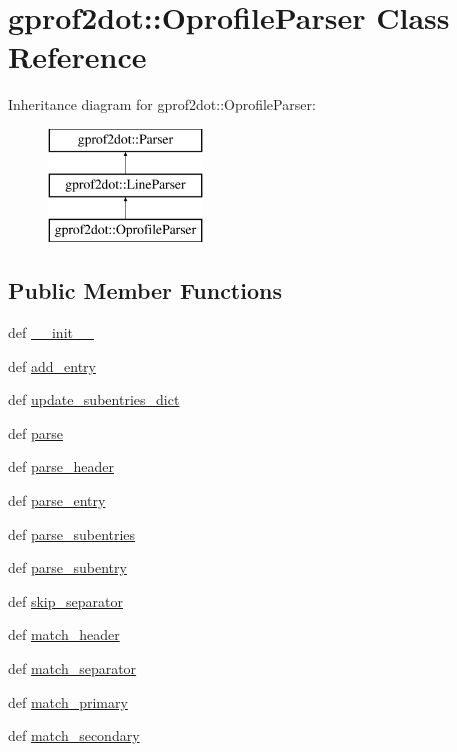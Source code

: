 \hypertarget{classgprof2dot_1_1OprofileParser}{
\section{gprof2dot::OprofileParser Class Reference}
\label{classgprof2dot_1_1OprofileParser}
}
Inheritance diagram for gprof2dot::OprofileParser:\begin{figure}[H]
\begin{center}
\leavevmode
\includegraphics[height=3.000000cm]{classgprof2dot_1_1OprofileParser}
\end{center}
\end{figure}
\subsection*{Public Member Functions}
\begin{DoxyCompactItemize}
\item 
def \hyperlink{classgprof2dot_1_1OprofileParser_aae02e1a72d89b05709613913e176d115}{\_\-\_\-init\_\-\_\-}
\item 
def \hyperlink{classgprof2dot_1_1OprofileParser_a143e933d3fe4c53372597352aa08380c}{add\_\-entry}
\item 
def \hyperlink{classgprof2dot_1_1OprofileParser_a1409df50024a67e935a99a53e1ff0bbc}{update\_\-subentries\_\-dict}
\item 
def \hyperlink{classgprof2dot_1_1OprofileParser_a7dada0cbdc4a1514f17b3bca3189d5c8}{parse}
\item 
def \hyperlink{classgprof2dot_1_1OprofileParser_aa6ba17211a7774baeb7e41e0d4ce0948}{parse\_\-header}
\item 
def \hyperlink{classgprof2dot_1_1OprofileParser_a29c6f9d3e1a96c0437fca323f005a202}{parse\_\-entry}
\item 
def \hyperlink{classgprof2dot_1_1OprofileParser_ac3e0d08e198332b96b768f13e518399d}{parse\_\-subentries}
\item 
def \hyperlink{classgprof2dot_1_1OprofileParser_a9f3d0a641b6dba474b236dedd003142d}{parse\_\-subentry}
\item 
def \hyperlink{classgprof2dot_1_1OprofileParser_ae64ad152a018ee3c92e8c0f9cc4f11d3}{skip\_\-separator}
\item 
def \hyperlink{classgprof2dot_1_1OprofileParser_a69301f37fbcb8138b0dc9f2a8ed8149a}{match\_\-header}
\item 
def \hyperlink{classgprof2dot_1_1OprofileParser_a14b0bf734f26f60a30de6d2d3ff95f19}{match\_\-separator}
\item 
def \hyperlink{classgprof2dot_1_1OprofileParser_a4a7e21f9219f339a85a9d8526e387f84}{match\_\-primary}
\item 
def \hyperlink{classgprof2dot_1_1OprofileParser_a0a692d8bc590f7873142cd2cfb99f74f}{match\_\-secondary}
\end{DoxyCompactItemize}

